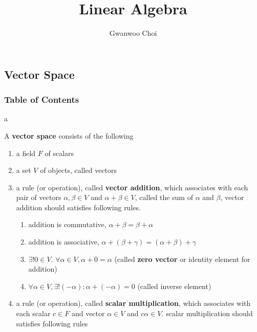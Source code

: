\documentclass[8pt]{beamer}
\title{Linear Algebra}
\author{Gwanwoo Choi}
\newcommand{\tb}[1]{\textbf{#1}}
\begin{document}
\begin{frame}
    \titlepage
\end{frame}


\subsection{Vector Space}

\begin{frame}
    \frametitle{Table of Contents}
    \tableofcontents[currentsubsection]
\end{frame}

\begin{frame}{a}
    \begin{definition}
        A \tb{vector space} consists of the following
        \begin{enumerate}
        \item a field $F$ of scalars
        \item a set $V$ of objects, called vectors
        \item a rule (or operation), called \tb{vector addition}, which associates with each pair of vectors $\alpha, \beta \in V$ and $\alpha + \beta \in V$, called the sum of $\alpha$ and $\beta$, vector addition should satisfies following rules. \begin{enumerate}
            \item addition is commutative, $\alpha + \beta = \beta + \alpha$    
            \item addition is associative, $\alpha + (\beta + \gamma) = (\alpha+ \beta) + \gamma$
            \item $\exists ! 0 \in V$. $\forall \alpha \in V, \alpha + 0 = \alpha$ (called \tb{zero vector} or identity element for addition)
            \item $\forall \alpha \in V, \exists ! (-\alpha) : \alpha  + (-\alpha) = 0$ (called inverse element)
            \end{enumerate}
        \item a rule (or operation), called \tb{scalar multiplication}, which associates with each scalar $c \in F$ and vector $\alpha \in V$ and $c\alpha \in V$. scalar multiplication should satisfies following rules \begin{enumerate}

\end{enumerate}
\end{enumerate}
\end{definition}
\end{frame}
\end{document}
